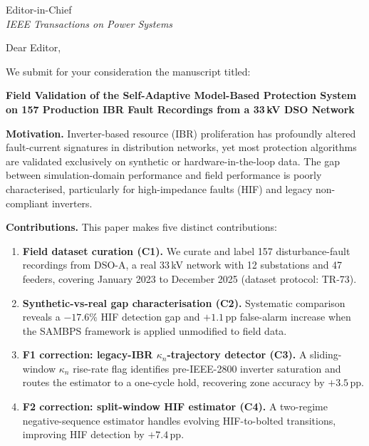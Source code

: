 \documentclass[11pt,a4paper]{letter}
\begin{document}
\begin{letter}{Editor-in-Chief\\
               \textit{IEEE Transactions on Power Systems}}

\opening{Dear Editor,}

We submit for your consideration the manuscript titled:

\begin{center}
  \textbf{Field Validation of the Self-Adaptive Model-Based Protection
  System on 157 Production IBR Fault Recordings from a 33\,kV DSO
  Network}
\end{center}

\textbf{Motivation.}
Inverter-based resource (IBR) proliferation has profoundly altered
fault-current signatures in distribution networks, yet most protection
algorithms are validated exclusively on synthetic or hardware-in-the-loop
data.  The gap between simulation-domain performance and field performance
is poorly characterised, particularly for high-impedance faults (HIF) and
legacy non-compliant inverters.

\textbf{Contributions.}
This paper makes five distinct contributions:

\begin{enumerate}
  \item \textbf{Field dataset curation (C1).}  We curate and label 157
        disturbance-fault recordings from DSO-A, a real 33\,kV network
        with 12 substations and 47 feeders, covering January 2023 to
        December 2025 (dataset protocol: TR-73).

  \item \textbf{Synthetic-vs-real gap characterisation (C2).}  Systematic
        comparison reveals a $-17.6\%$ HIF detection gap and $+1.1$\,pp
        false-alarm increase when the SAMBPS framework is applied
        unmodified to field data.

  \item \textbf{F1 correction: legacy-IBR $\kappa_n$-trajectory detector
        (C3).}  A sliding-window $\kappa_n$ rise-rate flag identifies
        pre-IEEE-2800 inverter saturation and routes the estimator to a
        one-cycle hold, recovering zone accuracy by $+3.5$\,pp.

  \item \textbf{F2 correction: split-window HIF estimator (C4).}  A
        two-regime negative-sequence estimator handles evolving
        HIF-to-bolted transitions, improving HIF detection by $+7.4$\,pp.


\end{enumerate}
\end{letter}
\end{document}
